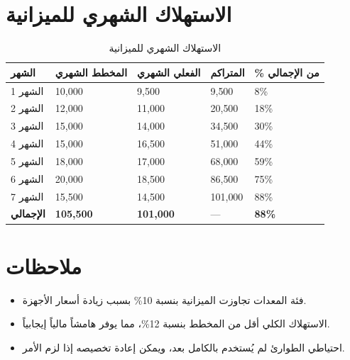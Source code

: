 \documentclass[11pt,a4paper]{article}
\begin{document}
\section{الاستهلاك الشهري للميزانية}
\label{sec:burn}

\begin{table}[H]
\centering
\caption{الاستهلاك الشهري للميزانية}
\renewcommand{\arraystretch}{1.4}
\begin{tabularx}{\textwidth}{C{2cm} R{3cm} R{3cm} R{3cm} C{2.5cm}}
\toprule
\textbf{الشهر} & \textbf{المخطط الشهري} & \textbf{الفعلي الشهري} & \textbf{المتراكم} & \textbf{\% من الإجمالي} \\
\midrule
الشهر 1 & 10{,}000 & 9{,}500 & 9{,}500 & 8\% \\
الشهر 2 & 12{,}000 & 11{,}000 & 20{,}500 & 18\% \\
الشهر 3 & 15{,}000 & 14{,}000 & 34{,}500 & 30\% \\
الشهر 4 & 15{,}000 & 16{,}500 & 51{,}000 & 44\% \\
الشهر 5 & 18{,}000 & 17{,}000 & 68{,}000 & 59\% \\
الشهر 6 & 20{,}000 & 18{,}500 & 86{,}500 & 75\% \\
الشهر 7 & 15{,}500 & 14{,}500 & 101{,}000 & 88\% \\
\midrule
\textbf{الإجمالي} & \textbf{105{,}500} & \textbf{101{,}000} & --- & \textbf{88\%} \\
\bottomrule
\end{tabularx}
\end{table}

\section{ملاحظات}
\label{sec:notes}

\begin{itemize}
    \item فئة المعدات تجاوزت الميزانية بنسبة 10\% بسبب زيادة أسعار الأجهزة.
    \item الاستهلاك الكلي أقل من المخطط بنسبة 12\%، مما يوفر هامشاً مالياً إيجابياً.
    \item احتياطي الطوارئ لم يُستخدم بالكامل بعد، ويمكن إعادة تخصيصه إذا لزم الأمر.
\end{itemize}
\end{document}
